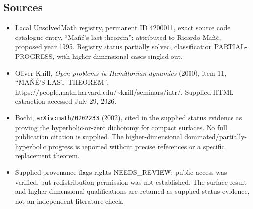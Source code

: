 \documentclass[11pt]{article}
\begin{document}
\subsection{Sources}
\begin{itemize}
\item Local UnsolvedMath registry, permanent ID 4200011, exact source code catalogue entry, ``Ma\~n\'e's last theorem''; attributed to Ricardo Ma\~n\'e, proposed year 1995. Registry status partially solved, classification PARTIAL-PROGRESS, with higher-dimensional cases singled out.
\item Oliver Knill, \emph{Open problems in Hamiltonian dynamics} (2000), item 11, ``MA\~N\'E'S LAST THEOREM'', \url{https://people.math.harvard.edu/~knill/seminars/intr/}. Supplied HTML extraction accessed July 29, 2026.
\item Bochi, \texttt{arXiv:math/0202233} (2002), cited in the supplied status evidence as proving the hyperbolic-or-zero dichotomy for compact surfaces. No full publication citation is supplied. The higher-dimensional dominated/partially-hyperbolic progress is reported without precise references or a specific replacement theorem.
\item Supplied provenance flags rights NEEDS\_REVIEW: public access was verified, but redistribution permission was not established. The surface result and higher-dimensional qualifications are retained as supplied status evidence, not an independent literature check.
\end{itemize}
\end{document}
